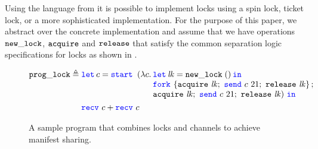 \newcommand{\locksimplefig}{
\begin{figure}
\begin{align*}
\simpleexamplename \eqdef{}&
  \LetNoIn \chan = \start {(\Lam \chan.
    \begin{array}[t]{@{}l@{}}
      \Let \lockvar = \newlock in \\
      \Fork { \acquirelock \lockvar;\ \send \chan {21};\ \releaselock \lockvar };\\
      \acquirelock \lockvar;\ \send \chan {21};\ \releaselock \lockvar)\ \In
    \end{array}
  } \\
  & \recv \chan + \recv \chan
\end{align*}
\caption{A sample program that combines locks and channels to
achieve manifest sharing.}
\label{fig:lock_simple}
\end{figure}}

\newcommand{\authfig}{
\begin{figure}
\begin{align*}
\TRUE \vs{}& \Exists\gname. \serverpredT \gname 0
  \tagH{Auth-init} \\
\serverpredT \gname n \vs{}&
  \clientpredT \gname * \serverpredT \gname {(1 + n)}
  \tagH{Auth-alloc} \\
\serverpredT \gname {(1 + n)} * \clientpredT \gname \vs{}&
  \serverpredT \gname n
  \tagH{Auth-dealloc} \\
\serverpredT \gname n * \clientpredT \gname \wand{}&
  n > 0
  \tagH{Auth-contrib-pos}
\end{align*}
\caption{The authoritative contribution ghost theory.}
\label{fig:auth}
\end{figure}}

Using the language from  it is possible to implement
locks using a spin lock, ticket lock, or a more sophisticated implementation.
For the purpose of this paper, we abstract over the concrete implementation
and assume that we have operations $\mathtt{new\_lock}$, $\mathtt{acquire}$ and $\mathtt{release}$
that satisfy the common separation logic specifications for locks as shown
in .

\locksfig
\locksimplefig

